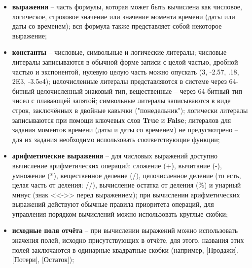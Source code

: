\documentclass[../user-manual.tex]{subfiles}
\begin{document}
	\begin{itemize}
		
		\item \textbf{выражения} -- часть формулы, которая может быть вычислена как числовое, логическое, строковое значение или значение момента времени (даты или даты со временем); вся формула также представляет собой некоторое выражение;
		
		\item \textbf{константы} -- числовые, символьные и логические литералы; числовые литералы записываются в обычной форме записи с целой частью, дробной частью и экспонентой, нулевую целую часть можно опускать (3, -2.57, .18, 2E3, -3.5e4); целочисленные литералы представляются в системе через 64-битный целочисленный знаковый тип, вещественные -- через 64-битный тип чисел с плавающей запятой; символьные литералы записываются в виде строк, заключённых в двойные кавычки ("понедельник"); логически литералы записываются при помощи ключевых слов \textbf{True} и \textbf{False}; литералов для задания моментов времени (даты и даты со временем) не предусмотрено -- для их задания необходимо использовать соответствующие функции;
		
		\item \textbf{арифметические выражения} -- для числовых выражений доступно вычисление арифметических операций: сложение (+), вычитание (-), умножение (*), вещественное деление (/), целочисленное деление (то есть, целая часть от деления: //), вычисление остатка от деления (\%) и унарный минус (знак <<->> перед выражением); при вычислении арифметических выражений действуют обычные правила приоритета операций, для управления порядком вычислений можно использовать круглые скобки;
		
		\item \textbf{исходные поля отчёта} -- при вычислении выражений можно использовать значения полей, исходно присутствующих в отчёте, для этого, названия этих полей заключаются в одинарные квадратные скобки (например, [Продажи], [Потери], [Остаток]);
		

\end{itemize}
\end{document}
